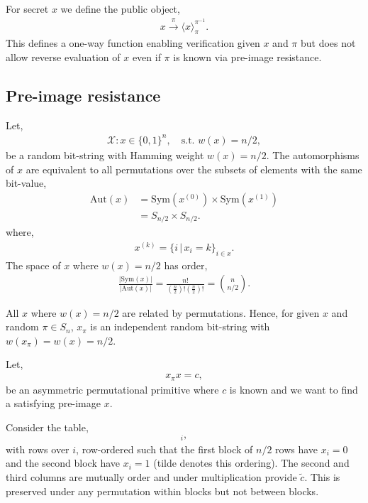 \documentclass[twocolumn, aps, amsmath, amssymb, nofootinbib, superscriptaddress, longbibliography, doublefloatfix, table-of-contents, eqsecnum, rmp]{revtex4-2}
\makeatletter
\def\selfbraid#1#2#3{\langle#1\rangle_{#2}^{#3}}
\newcommand{\soplus}{{{\hspace{1pt}}{\mathbin{\mathpalette\make@small\oplus}}}{\hspace{1pt}}}
\newcommand{\make@small}[2]{%
  \vcenter{\hbox{%
    \scalebox{0.6}{$\m@th#1#2$}%
  }}%
}
\makeatother
\begin{document}
For secret $x$ we define the public object,
\begin{align} \label{eq:one_way_sum}
	x \xrightarrow{\pi} \selfbraid{x}{\pi}{\pi^{-1}}.
\end{align}
This defines a one-way function enabling verification given $x$ and $\pi$ but does not allow reverse evaluation of $x$ even if $\pi$ is known via pre-image resistance.

\subsection{Pre-image resistance}

Let,
\begin{align}
	\mathcal{X}: x\in\{0,1\}^n,\quad \mathrm{s.t.}\,\,w(x)=n/2,
\end{align}
be a random bit-string with Hamming weight \mbox{$w(x)=n/2$}. The automorphisms of $x$ are equivalent to all permutations over the subsets of elements with the same bit-value,
\begin{align}
	\mathrm{Aut}(x) &= \mathrm{Sym}(x^{(0)}) \times \mathrm{Sym}(x^{(1)}) \nonumber\\
	&= S_{n/2}\times S_{n/2}.
\end{align}
where,
\begin{align}
	x^{(k)}=\{i\,|\, x_i=k\}_{i\in x}.
\end{align}
The space of $x$ where $w(x)=n/2$ has order,
\begin{align}
	\frac{|\mathrm{Sym}(x)|}{|\mathrm{Aut}(x)|} = \frac{n!}{(\frac{n}{2})!(\frac{n}{2})!} = \binom{n}{n/2}.
\end{align}

All $x$ where $w(x)=n/2$ are related by permutations. Hence, for given $x$ and random $\pi\in S_n$, $x_\pi$ is an independent random bit-string with $w(x_\pi)=w(x)=n/2$.

Let,
\begin{align}
	x_\pi x = c,
\end{align}
be an asymmetric permutational primitive where $c$ is known and we want to find a satisfying pre-image $x$.

Consider the table,
\begin{align}
	[x_\pi,\tilde{x},\tilde{x}\soplus \tilde{c}]_i,
\end{align}
with rows over $i$, row-ordered such that the first block of $n/2$ rows have $x_i=0$ and the second block have $x_i=1$ (tilde denotes this ordering). The second and third columns are mutually order and under multiplication provide $\tilde{c}$. This is preserved under any permutation within blocks but not between blocks.
\end{document}
